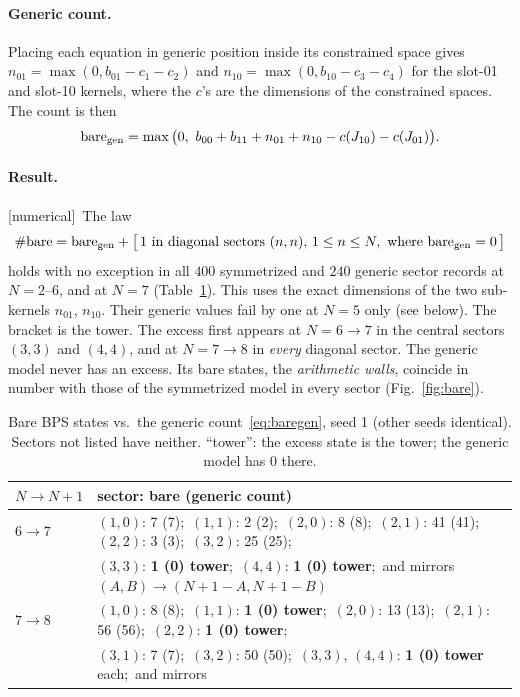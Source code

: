 \documentclass[11pt]{article}
\newcommand{\tagbox}[2]{\textsf{\small\color{#1}[#2]}}
\newcommand{\NUM}{\tagbox{cnum}{numerical}}
\theoremstyle{plain}
\theoremstyle{remark}
\numberwithin{equation}{section}
\begin{document}
\paragraph{Generic count.} Placing each equation in generic position inside its constrained space gives
$n_{01}=\max(0,b_{01}-c_1-c_2)$ and $n_{10}=\max(0,b_{10}-c_3-c_4)$ for the slot-01 and slot-10 kernels, where the
$c$'s are the dimensions of the constrained spaces. The count is then
\begin{equation}\label{eq:baregen}
\text{bare}_{\rm gen}=\max\big(0,\ b_{00}+b_{11}+n_{01}+n_{10}-c(J_{10})-c(J_{01})\big).
\end{equation}

\paragraph{Result.} \NUM\ The law
\begin{equation}\label{eq:barelaw}
\#\text{bare}=\text{bare}_{\rm gen}+\big[\,1\ \text{in diagonal sectors }(n,n),\,1\le n\le N,\ \text{where}\ \text{bare}_{\rm gen}=0\,\big]
\end{equation}
holds with no exception in all $400$ symmetrized and $240$ generic sector records at $N=2$--$6$, and at $N=7$
(Table~\ref{tab:bare}). This uses the exact dimensions of the two sub-kernels $n_{01}$, $n_{10}$. Their generic values fail
by one at $N=5$ only (see below). The bracket is the tower. The excess first appears at $N=6\to7$ in the central sectors
$(3,3)$ and $(4,4)$, and at $N=7\to8$ in \emph{every} diagonal sector. The generic model never has an excess. Its bare
states, the \emph{arithmetic walls}, coincide in number with those of the symmetrized model in every sector
(Fig.~\ref{fig:bare}).

\begin{table}[ht]
\centering\small
\caption{Bare BPS states vs.\ the generic count~\eqref{eq:baregen}, seed 1 (other seeds identical). Sectors not listed
have neither. ``tower'': the excess state is the tower; the generic model has $0$ there.}\label{tab:bare}
\begin{tabular}{@{}ll@{}}\toprule
$N\to N+1$ & sector: bare (generic count)\\\midrule
$6\to7$ & $(1,0)$: 7 (7);\ $(1,1)$: 2 (2);\ $(2,0)$: 8 (8);\ $(2,1)$: 41 (41);\ $(2,2)$: 3 (3);\ $(3,2)$: 25 (25);\\
 & $(3,3)$: \textbf{1 (0) tower};\ $(4,4)$: \textbf{1 (0) tower};\ and mirrors $(A,B)\to(N{+}1{-}A,N{+}1{-}B)$\\
$7\to8$ & $(1,0)$: 8 (8);\ $(1,1)$: \textbf{1 (0) tower};\ $(2,0)$: 13 (13);\ $(2,1)$: 56 (56);\ $(2,2)$: \textbf{1 (0) tower};\\
 & $(3,1)$: 7 (7);\ $(3,2)$: 50 (50);\ $(3,3)$, $(4,4)$: \textbf{1 (0) tower} each;\ and mirrors\\\bottomrule
\end{tabular}
\end{table}
\end{document}
